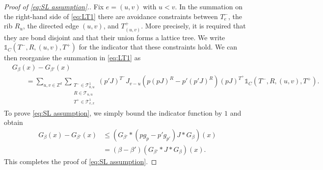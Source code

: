 \documentclass[11pt,a4paper]{article}
\numberwithin{equation}{section}
\theoremstyle{plain}
\theoremstyle{definition}
\newcommand\1{\mathds{1}}
\begin{document}
\begin{proof}[Proof of \eqref{eq:SL assumption}.]
Fix $e=(u,v)$ with $u<v$.
In the summation on the right-hand side of \eqref{eq:LT1} there are avoidance
constraints between $T_e^-$, the rib $R_u$, the directed edge $(u,v)$, and $T_{(u,v)}^+$. More precisely, it is required that they are bond disjoint and that their union forms a lattice tree.
We write $\1_{C}(T^-,R,(u,v),T^+)$ for the indicator that these constraints hold.  We can then reorganise the summation in \eqref{eq:LT1} as
\begin{align}
    &G_\beta(x)-G_{\beta'}(x)
    \\ \nonumber & \qquad = \sum_{u,v \in \mathbb{Z}^d}
    \sum_{\substack{T^- \in \mathcal{T}^1_{0,u} \\ R \in \mathcal{T}_{u,u}\\ T^+ \in \mathcal{T}^1_{v,x}} }
    (p'J)^{T^{-}} J_{v-u}\left(p(pJ)^{R}-p'(p'J)^{R}\right) (pJ)^{T^{+}} \1_{C}(T^-,R,(u,v),T^+)
    .
\label{eq: maindecompLT}
\end{align}
To prove  \eqref{eq:SL assumption}, we simply bound the indicator function by $1$ and obtain
\begin{align}
    G_\beta(x)-G_{\beta'}(x) &\le
    (G_{\beta'}*(pg_p-p'g_{p'})J*G_\beta)(x)
    \nonumber \\ & =
    (\beta-\beta')(G_{\beta'}*J*G_\beta)(x)
    .
\end{align}
This completes the proof of \eqref{eq:SL assumption}.
\end{proof}
\end{document}
